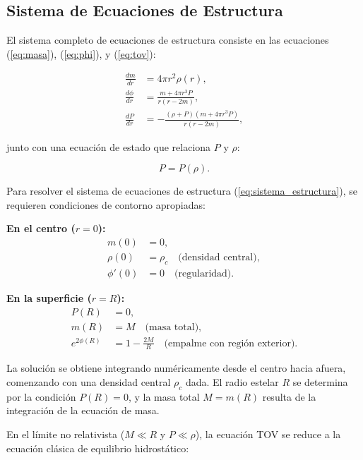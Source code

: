\subsection{Sistema de Ecuaciones de Estructura}

El sistema completo de ecuaciones de estructura consiste en las ecuaciones (\ref{eq:masa}), (\ref{eq:phi}), y (\ref{eq:tov}):

\begin{equation}
\begin{aligned}
	\frac{dm}{dr} &= 4\pi r^2 \rho(r), \\
	\frac{d\phi}{dr} &= \frac{m + 4\pi r^3 P}{r(r - 2m)}, \\
	\frac{dP}{dr} &= -\frac{(\rho + P)(m + 4\pi r^3 P)}{r(r - 2m)},
\end{aligned}
\label{eq:sistema_estructura}
\end{equation}

junto con una ecuación de estado que relaciona $P$ y $\rho$:

\begin{equation}
	P = P(\rho).
	\label{eq:ecuacion_estado}
\end{equation}

Para resolver el sistema de ecuaciones de estructura (\ref{eq:sistema_estructura}), se requieren condiciones de contorno apropiadas:

\textbf{En el centro ($r = 0$):}
\begin{align}
	m(0) &= 0, \\
	\rho(0) &= \rho_c \quad \text{(densidad central)}, \\
	\phi'(0) &= 0 \quad \text{(regularidad)}.
\end{align}

\textbf{En la superficie ($r = R$):}
\begin{align}
	P(R) &= 0, \\
	m(R) &= M \quad \text{(masa total)}, \\
	e^{2\phi(R)} &= 1 - \frac{2M}{R} \quad \text{(empalme con región exterior)}.
\end{align}

La solución se obtiene integrando numéricamente desde el centro hacia afuera, comenzando con una densidad central $\rho_c$ dada. El radio estelar $R$ se determina por la condición $P(R) = 0$, y la masa total $M = m(R)$ resulta de la integración de la ecuación de masa.

En el límite no relativista ($M \ll R$ y $P \ll \rho$), la ecuación TOV se reduce a la ecuación clásica de equilibrio hidrostático:

